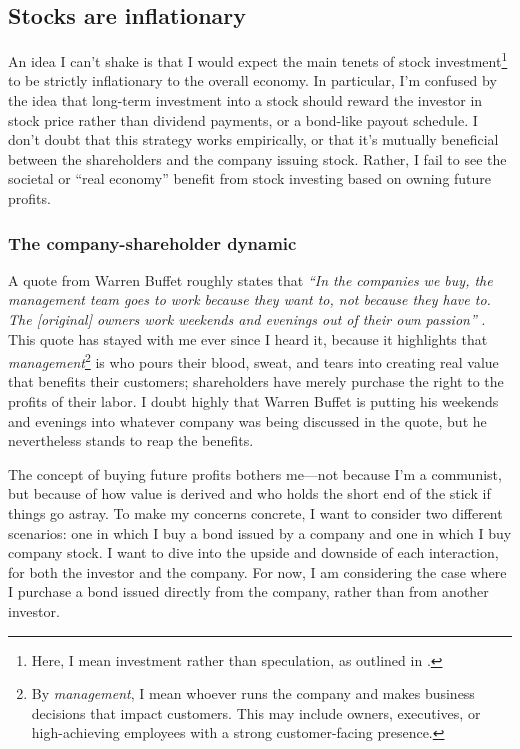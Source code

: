 \subsection{Stocks are inflationary}

An idea I can't shake is that I would expect the main tenets of stock investment\footnote{Here, I mean investment rather than speculation, as outlined in \cite{Graham2024}.} to be strictly inflationary to the overall economy.  In particular, I'm confused by the idea that long-term investment into a stock should reward the investor in stock price rather than dividend payments, or a bond-like payout schedule.  I don't doubt that this strategy works empirically, or that it's mutually beneficial between the shareholders and the company issuing stock.  Rather, I fail to see the societal or ``real economy'' benefit from stock investing based on owning future profits.

\subsubsection{The company-shareholder dynamic}

A quote from Warren Buffet roughly states that {\it ``In the companies we buy, the management team goes to work because they want to, not because they have to.  The [original] owners work weekends and evenings out of their own passion''} .  This quote has stayed with me ever since I heard it, because it highlights that {\it management}\footnote{By {\it management}, I mean whoever runs the company and makes business decisions that impact customers.  This may include owners, executives, or high-achieving employees with a strong customer-facing presence.} is who pours their blood, sweat, and tears into creating real value that benefits their customers; shareholders have merely purchase the right to the profits of their labor.  I doubt highly that Warren Buffet is putting his weekends and evenings into whatever company was being discussed in the quote, but he nevertheless stands to reap the benefits.

The concept of buying future profits bothers me---not because I'm a communist, but because of how value is derived and who holds the short end of the stick if things go astray.  To make my concerns concrete, I want to consider two different scenarios: one in which I buy a bond issued by a company and one in which I buy company stock.  I want to dive into the upside and downside of each interaction, for both the investor and the company.  For now, I am considering the case where I purchase a bond issued directly from the company, rather than from another investor.

